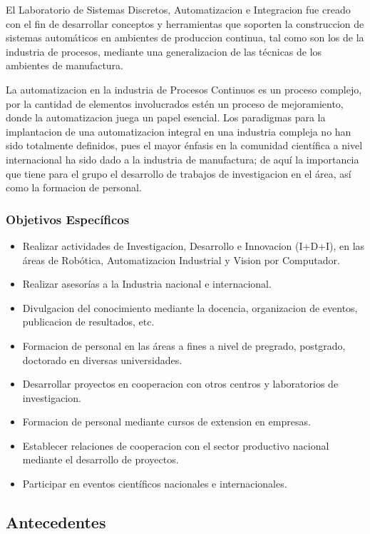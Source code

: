 El Laboratorio de Sistemas Discretos, Automatizacion e Integracion fue creado con el fin de desarrollar conceptos y herramientas que soporten la construccion de sistemas automáticos en ambientes de produccion continua, tal como son los de la industria de procesos, mediante una generalizacion de las técnicas de los ambientes de manufactura.

La automatizacion en la industria de Procesos Continuos es un proceso complejo, por la cantidad de elementos involucrados estén un proceso de mejoramiento, donde la automatizacion juega un papel esencial. Los paradigmas para la implantacion de una automatizacion integral en una industria compleja no han sido totalmente definidos, pues el mayor énfasis en la comunidad científica a nivel internacional ha sido dado a la industria de manufactura; de aquí la importancia que tiene para el grupo el desarrollo de trabajos de investigacion en el área, así como la formacion de personal.

\subsubsection{Objetivos Específicos}

\begin{itemize}
	\itemsep1pt \parskip0pt 
	\item Realizar actividades de Investigacion, Desarrollo e Innovacion (I+D+I), en las áreas de Robótica, Automatizacion Industrial y Vision por Computador.
    \item Realizar asesorías a la Industria nacional e internacional.
    \item Divulgacion del conocimiento mediante la docencia, organizacion de eventos, publicacion de resultados, etc.
    \item Formacion de personal en las áreas a fines a nivel de pregrado, postgrado, doctorado en diversas universidades.
    \item Desarrollar proyectos en cooperacion con otros centros y laboratorios de investigacion.
    \item Formacion de personal mediante cursos de extension en empresas.
    \item Establecer relaciones de cooperacion con el sector productivo nacional mediante el desarrollo de proyectos.
    \item Participar en eventos científicos nacionales e internacionales.
\end{itemize}

\subsection{Antecedentes}

